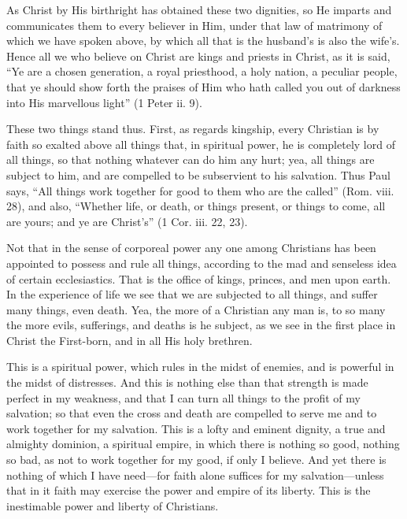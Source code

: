 As Christ by His birthright has obtained these two dignities, so He
imparts and communicates them to every believer in Him, under that law of
matrimony of which we have spoken above, by which all that is the
husband's is also the wife's. Hence all we who believe on Christ are kings
and priests in Christ, as it is said, ``Ye are a chosen generation, a royal
priesthood, a holy nation, a peculiar people, that ye should show forth
the praises of Him who hath called you out of darkness into His marvellous
light'' (1 Peter ii. 9).

These two things stand thus. First, as regards kingship, every Christian
is by faith so exalted above all things that, in spiritual power, he is
completely lord of all things, so that nothing whatever can do him any
hurt; yea, all things are subject to him, and are compelled to be
subservient to his salvation. Thus Paul says, ``All things work together
for good to them who are the called'' (Rom. viii. 28), and also, ``Whether
life, or death, or things present, or things to come, all are yours; and
ye are Christ's'' (1 Cor. iii. 22, 23).

Not that in the sense of corporeal power any one among Christians has been
appointed to possess and rule all things, according to the mad and
senseless idea of certain ecclesiastics. That is the office of kings,
princes, and men upon earth. In the experience of life we see that we are
subjected to all things, and suffer many things, even death. Yea, the more
of a Christian any man is, to so many the more evils, sufferings, and
deaths is he subject, as we see in the first place in Christ the
First-born, and in all His holy brethren.

This is a spiritual power, which rules in the midst of enemies, and is
powerful in the midst of distresses. And this is nothing else than that
strength is made perfect in my weakness, and that I can turn all things to
the profit of my salvation; so that even the cross and death are compelled
to serve me and to work together for my salvation. This is a lofty and
eminent dignity, a true and almighty dominion, a spiritual empire, in
which there is nothing so good, nothing so bad, as not to work together
for my good, if only I believe. And yet there is nothing of which I have
need—for faith alone suffices for my salvation—unless that in
it faith may exercise the power and empire of its liberty. This is the
inestimable power and liberty of Christians.

